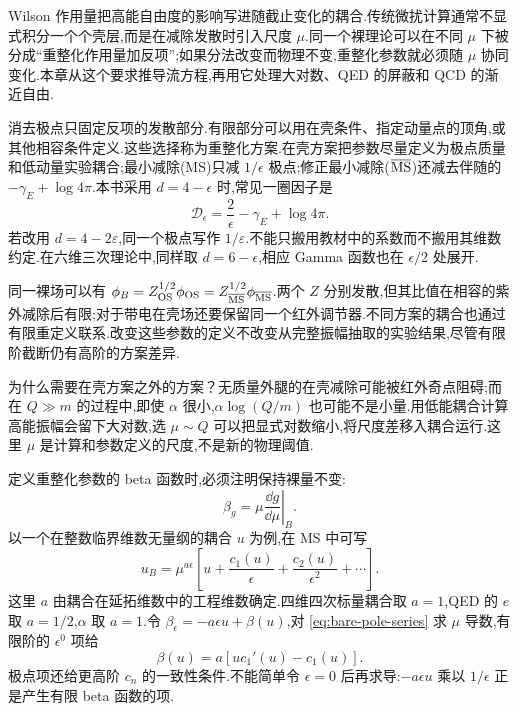 \label{ch:traditional-rg}

Wilson 作用量把高能自由度的影响写进随截止变化的耦合.传统微扰计算通常不显式积分一个个壳层,而是在减除发散时引入尺度 $\mu$.同一个裸理论可以在不同 $\mu$ 下被分成“重整化作用量加反项”;如果分法改变而物理不变,重整化参数就必须随 $\mu$ 协同变化.本章从这个要求推导流方程,再用它处理大对数、QED 的屏蔽和 QCD 的渐近自由.


消去极点只固定反项的发散部分.有限部分可以用在壳条件、指定动量点的顶角,或其他相容条件定义.这些选择称为重整化方案.在壳方案把参数尽量定义为极点质量和低动量实验耦合;最小减除(MS)只减 $1/\epsilon$ 极点;修正最小减除($\overline{\rm MS}$)还减去伴随的 $-\gamma_E+\log4\pi$.本书采用 $d=4-\epsilon$ 时,常见一圈因子是
\begin{equation}
 \mathcal D_\epsilon=\frac2\epsilon-\gamma_E+\log4\pi.
\end{equation}
若改用 $d=4-2\varepsilon$,同一个极点写作 $1/\varepsilon$.不能只搬用教材中的系数而不搬用其维数约定.在六维三次理论中,同样取 $d=6-\epsilon$,相应 Gamma 函数也在 $\epsilon/2$ 处展开.

同一裸场可以有 $\phi_B=Z_{\rm OS}^{1/2}\phi_{\rm OS}
=Z_{\overline{\rm MS}}^{1/2}\phi_{\overline{\rm MS}}$.两个 $Z$ 分别发散,但其比值在相容的紫外减除后有限;对于带电在壳场还要保留同一个红外调节器.不同方案的耦合也通过有限重定义联系.改变这些参数的定义不改变从完整振幅抽取的实验结果,尽管有限阶截断仍有高阶的方案差异.

为什么需要在壳方案之外的方案？无质量外腿的在壳减除可能被红外奇点阻碍;而在 $Q\gg m$ 的过程中,即使 $\alpha$ 很小,$\alpha\log(Q/m)$ 也可能不是小量.用低能耦合计算高能振幅会留下大对数,选 $\mu\sim Q$ 可以把显式对数缩小,将尺度差移入耦合运行.这里 $\mu$ 是计算和参数定义的尺度,不是新的物理阈值.


定义重整化参数的 beta 函数时,必须注明保持裸量不变:
\begin{equation}
 \beta_g=\left.\mu\frac{\dd g}{\dd\mu}\right|_B.
 \label{eq:traditional-beta-definition}
\end{equation}
以一个在整数临界维数无量纲的耦合 $u$ 为例,在 MS 中可写
\begin{equation}
 u_B=\mu^{a\epsilon}
       \left[u+\frac{c_1(u)}\epsilon+
                    \frac{c_2(u)}{\epsilon^2}+\cdots\right].
 \label{eq:bare-pole-series}
\end{equation}
这里 $a$ 由耦合在延拓维数中的工程维数确定.四维四次标量耦合取 $a=1$,QED 的 $e$ 取 $a=1/2$,$\alpha$ 取 $a=1$.令
$\beta_\epsilon=-a\epsilon u+\beta(u)$,对 \eqref{eq:bare-pole-series} 求 $\mu$ 导数,有限阶的 $\epsilon^0$ 项给
\begin{equation}
 \beta(u)=a\left[u c_1'(u)-c_1(u)\right].
 \label{eq:beta-from-simple-pole}
\end{equation}
极点项还给更高阶 $c_n$ 的一致性条件.不能简单令 $\epsilon=0$ 后再求导:$-a\epsilon u$ 乘以 $1/\epsilon$ 正是产生有限 beta 函数的项.


